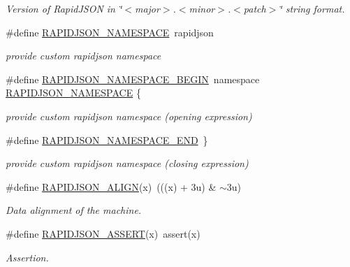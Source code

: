 \begin{DoxyCompactItemize}
\begin{DoxyCompactList}\small\item\em Version of Rapid\+J\+S\+ON in \char`\"{}$<$major$>$.$<$minor$>$.$<$patch$>$\char`\"{} string format. \end{DoxyCompactList}\item 
\#define \hyperlink{group___r_a_p_i_d_j_s_o_n___c_o_n_f_i_g_ga743a79d3af927391fe3eb5c979136899}{R\+A\+P\+I\+D\+J\+S\+O\+N\+\_\+\+N\+A\+M\+E\+S\+P\+A\+CE}~rapidjson
\begin{DoxyCompactList}\small\item\em provide custom rapidjson namespace \end{DoxyCompactList}\item 
\#define \hyperlink{group___r_a_p_i_d_j_s_o_n___c_o_n_f_i_g_gad3806c8251fdc7da9618b7e922674ffc}{R\+A\+P\+I\+D\+J\+S\+O\+N\+\_\+\+N\+A\+M\+E\+S\+P\+A\+C\+E\+\_\+\+B\+E\+G\+IN}~namespace \hyperlink{group___r_a_p_i_d_j_s_o_n___c_o_n_f_i_g_ga743a79d3af927391fe3eb5c979136899}{R\+A\+P\+I\+D\+J\+S\+O\+N\+\_\+\+N\+A\+M\+E\+S\+P\+A\+CE} \{
\begin{DoxyCompactList}\small\item\em provide custom rapidjson namespace (opening expression) \end{DoxyCompactList}\item 
\#define \hyperlink{group___r_a_p_i_d_j_s_o_n___c_o_n_f_i_g_gaf18f052a98b9f5df5448d39484b743c1}{R\+A\+P\+I\+D\+J\+S\+O\+N\+\_\+\+N\+A\+M\+E\+S\+P\+A\+C\+E\+\_\+\+E\+ND}~\}
\begin{DoxyCompactList}\small\item\em provide custom rapidjson namespace (closing expression) \end{DoxyCompactList}\item 
\#define \hyperlink{group___r_a_p_i_d_j_s_o_n___c_o_n_f_i_g_ga583915242504c7fdb36e826f02f76242}{R\+A\+P\+I\+D\+J\+S\+O\+N\+\_\+\+A\+L\+I\+GN}(x)~(((x) + 3u) \& $\sim$3u)
\begin{DoxyCompactList}\small\item\em Data alignment of the machine. \end{DoxyCompactList}\item 
\#define \hyperlink{group___r_a_p_i_d_j_s_o_n___c_o_n_f_i_g_gabeba18d612187bad2ac62aed9276d47c}{R\+A\+P\+I\+D\+J\+S\+O\+N\+\_\+\+A\+S\+S\+E\+RT}(x)~assert(x)
\begin{DoxyCompactList}\small\item\em Assertion. \end{DoxyCompactList}\end{DoxyCompactItemize}


